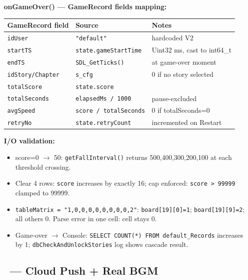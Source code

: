 \documentclass[12pt,a4paper]{article}
\begin{document}
\noindent\textbf{onGameOver() --- GameRecord fields mapping:}
\begin{center}\small
\begin{tabular}{@{}l l l@{}}
\hline
\textbf{GameRecord field} & \textbf{Source} & \textbf{Notes} \\
\hline
\texttt{idUser}       & \foreignlanguage{english}{\texttt{"default"}} & hardcoded V2 \\
\texttt{startTS}      & \texttt{state.gameStartTime} & Uint32 ms, cast to int64\_t \\
\texttt{endTS}        & \texttt{SDL\_GetTicks()} & at game-over moment \\
\texttt{idStory/Chapter} & \texttt{s\_cfg} & 0 if no story selected \\
\texttt{totalScore}   & \texttt{state.score} & \\
\texttt{totalSeconds} & \texttt{elapsedMs / 1000} & pause-excluded \\
\texttt{avgSpeed}     & \texttt{score / totalSeconds} & 0 if totalSeconds=0 \\
\texttt{retryNo}      & \texttt{state.retryCount} & incremented on Restart \\
\hline
\end{tabular}
\end{center}

\noindent\textbf{I/O validation:}
\begin{itemize}[nosep]
  \item score=0 $\rightarrow$ 50: \texttt{getFallInterval()} returns
        500,400,300,200,100 at each threshold crossing.
  \item Clear 4 rows: \texttt{score} increases by exactly 16; cap
        enforced: \texttt{score > 99999} clamped to 99999.
  \item \foreignlanguage{english}{\texttt{tableMatrix = "1,0,0,0,0,0,0,0,0,2"}}:
        \texttt{board[19][0]=1}; \texttt{board[19][9]=2};
        all others 0. Parse error in one cell: cell stays 0.
  \item Game-over $\rightarrow$ Console: \texttt{SELECT COUNT(*) FROM
        default\_Records} increases by 1; \texttt{dbCheckAndUnlockStories}
        log shows cascade result.
\end{itemize}

\subsection{\Vthree\ --- Cloud Push + Real BGM}
\end{document}
